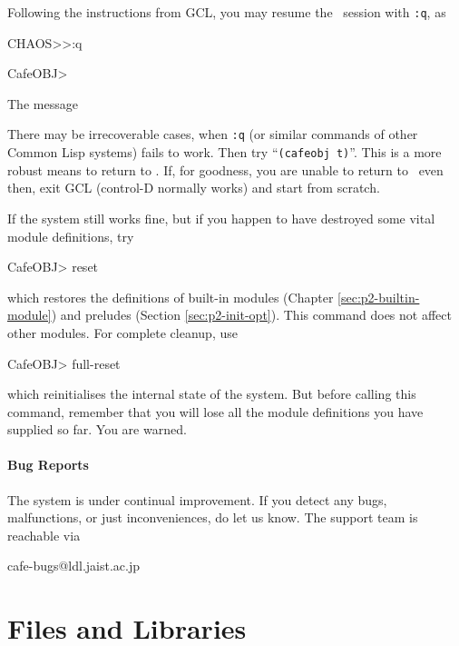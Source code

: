 \documentclass[a4paper]{memoir}
\begin{document}
Following the instructions from GCL, you may resume the \cafeobj~session
with \verb|:q|, as
\begin{vvtm}
\begin{ccode}
  CHAOS>>:q

  CafeOBJ>
\end{ccode}
\end{vvtm}
The message 

There may be irrecoverable cases, when \verb|:q| (or similar commands of
other Common Lisp systems) fails to work.
Then try ``\verb|(cafeobj t)|''. This is a more
robust means to return to \cafeobj. If, for goodness, you are unable
to return to \cafeobj~even then, exit GCL (control-D normally works)
and start from scratch.

If the system still works fine, but if you happen to have destroyed
some vital module definitions, try
\begin{vvtm}
\begin{ccode}
  CafeOBJ> reset
\end{ccode}
\end{vvtm}
which restores the definitions of built-in modules (Chapter
\ref{sec:p2-builtin-module}) and preludes (Section \ref{sec:p2-init-opt}).
This command does not affect other modules. For complete cleanup, use
\begin{vvtm}
\begin{ccode}
  CafeOBJ> full-reset
\end{ccode}
\end{vvtm}
which reinitialises the internal state of the system. But before calling
this command, remember that
you will lose all the module definitions you have supplied so far.
You are warned.

\paragraph{Bug Reports}

The system is under continual improvement. If you detect any bugs,
malfunctions, or just inconveniences, do let us know. The support team is
reachable via
\begin{vvtm}
\begin{ccode}
  cafe-bugs@ldl.jaist.ac.jp
\end{ccode}
\end{vvtm}

\section{Files and Libraries}
\end{document}
